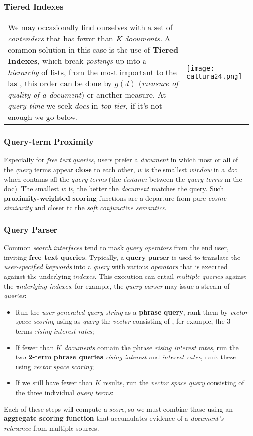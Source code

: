 \documentclass{article}
\begin{document}
\subsubsection{Tiered Indexes}
\begin{tabular}{L{8cm} C{5.5cm}}
We may occasionally find ourselves with a set of \emph{contenders} that has fewer than\emph{ K documents}. A common solution in this case is the use of \textbf{Tiered Indexes}, which break \emph{postings} up into a \emph{hierarchy} of lists, from the most important to the last, this order can be done by $g(d)$ (\emph{measure of quality of a document}) or another measure. At \emph{query time} we seek \emph{docs} in \emph{top tier}, if it's not enough we go below. 
& \texttt{[image: cattura24.png]} 
\end{tabular}
\subsubsection{Query-term Proximity}
Especially for \emph{free text queries}, users prefer a \emph{document} in which most or all of the \emph{query} terms appear \textbf{close} to each other,  $w$ is the smallest \emph{window} in a \emph{doc} which contains all the \emph{query terms} (the \emph{distance} between the \emph{query terms} in the doc). The smallest $w$ is, the better the \emph{document} matches the query. Such \textbf{proximity-weighted scoring} functions are a departure from pure \emph{cosine similarity} and closer to the \emph{soft conjunctive semantics}.
\subsubsection{Query Parser}
Common \emph{search interfaces} tend to mask \emph{query operators} from the end user, inviting \textbf{free text queries}. Typically, a \textbf{query parser} is used to translate the \emph{user-specified keywords} into a \emph{query} with various \emph{operators} that is executed against the underlying \emph{indexes}. This execution can entail \emph{multiple queries} against the \emph{underlying indexes}, for example, the \emph{query parser} may issue a stream of \emph{queries}:
\begin{itemize}
\item Run the \emph{user-generated query string} as a \textbf{phrase query}, rank them by \emph{vector space scoring} using as \emph{query} the \emph{vector} consisting of , for example, the 3 terms \emph{rising interest rates};
\item If fewer than $K$ \emph{documents} contain the phrase \emph{rising interest rates}, run the two\textbf{ 2-term phrase queries} \emph{rising interest} and \emph{interest rates}, rank these using \emph{vector space scoring};
\item If we still have fewer than $K$ results, run the \emph{vector space query} consisting of the three individual \emph{query terms};
\end{itemize}
Each of these steps will compute a \emph{score}, so we must combine these using an \textbf{aggregate scoring function} that accumulates evidence of a \emph{document’s relevance} from multiple sources.
\end{document}
